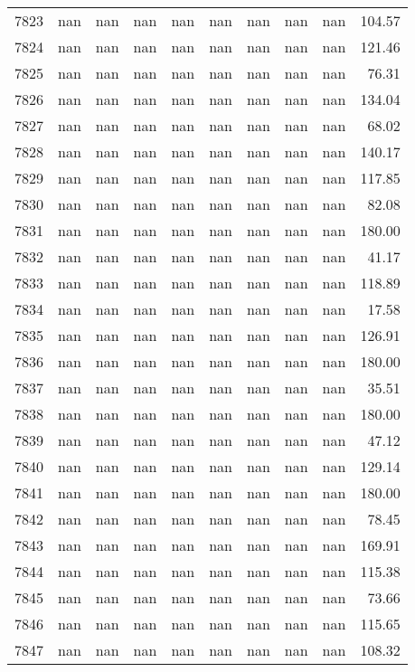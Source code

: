 \begin{tabular}{lrrrrrrrrr}
7823 & nan & nan & nan & nan & nan & nan & nan & nan & 104.57 \\
7824 & nan & nan & nan & nan & nan & nan & nan & nan & 121.46 \\
7825 & nan & nan & nan & nan & nan & nan & nan & nan & 76.31 \\
7826 & nan & nan & nan & nan & nan & nan & nan & nan & 134.04 \\
7827 & nan & nan & nan & nan & nan & nan & nan & nan & 68.02 \\
7828 & nan & nan & nan & nan & nan & nan & nan & nan & 140.17 \\
7829 & nan & nan & nan & nan & nan & nan & nan & nan & 117.85 \\
7830 & nan & nan & nan & nan & nan & nan & nan & nan & 82.08 \\
7831 & nan & nan & nan & nan & nan & nan & nan & nan & 180.00 \\
7832 & nan & nan & nan & nan & nan & nan & nan & nan & 41.17 \\
7833 & nan & nan & nan & nan & nan & nan & nan & nan & 118.89 \\
7834 & nan & nan & nan & nan & nan & nan & nan & nan & 17.58 \\
7835 & nan & nan & nan & nan & nan & nan & nan & nan & 126.91 \\
7836 & nan & nan & nan & nan & nan & nan & nan & nan & 180.00 \\
7837 & nan & nan & nan & nan & nan & nan & nan & nan & 35.51 \\
7838 & nan & nan & nan & nan & nan & nan & nan & nan & 180.00 \\
7839 & nan & nan & nan & nan & nan & nan & nan & nan & 47.12 \\
7840 & nan & nan & nan & nan & nan & nan & nan & nan & 129.14 \\
7841 & nan & nan & nan & nan & nan & nan & nan & nan & 180.00 \\
7842 & nan & nan & nan & nan & nan & nan & nan & nan & 78.45 \\
7843 & nan & nan & nan & nan & nan & nan & nan & nan & 169.91 \\
7844 & nan & nan & nan & nan & nan & nan & nan & nan & 115.38 \\
7845 & nan & nan & nan & nan & nan & nan & nan & nan & 73.66 \\
7846 & nan & nan & nan & nan & nan & nan & nan & nan & 115.65 \\
7847 & nan & nan & nan & nan & nan & nan & nan & nan & 108.32 \\

\end{tabular}
